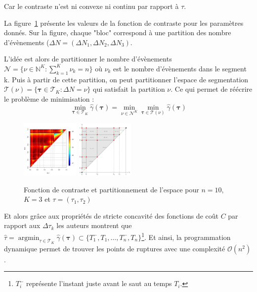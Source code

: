 \documentclass[a4paper,10pt]{article}\usepackage[]{graphicx}\usepackage[]{xcolor}
\DeclareMathOperator*{\argmin}{argmin}
\newcommand{\segspace}{\mathcal{T}_K}
\newcommand{\N}{\mathbb{N}}
\begin{document}
Car le contraste n'est ni convexe ni continu par rapport à $\tau$.

La figure~\ref{fig:contrast-function} présente les valeurs de la fonction de 
contraste pour les paramètres donnés. Sur la figure, chaque "bloc" correspond à
une partition des nombre d'évènements ($\Delta N = (\Delta N_1, \Delta N_2, 
\Delta N_3)$.

L'idée est alors de partitionner le nombre d'évènements  $\mathcal{N} = 
\bigl\{ \nu \in \N^K : \sum_{k=1}^K \nu_k = n \bigr\}$ où $\nu_k$ est le nombre
d'évènements dans le segment k. Puis à partir de cette partition, on peut 
partitionner l'espace de segmentation $\mathcal{T}(\nu) = 
\bigl\{ \bm \tau \in \segspace : \Delta N = \nu \bigr\}$ qui satisfait la 
partition $\nu$. Ce qui permet de réécrire le problème de minimisation :
$$\min_{\bm{\tau}\in\segspace} \widehat \gamma (\bm{\tau}) = \min_{\nu \in 
\mathcal{N}^K} \min_{\bm{\tau}\in\mathcal{T}(\nu)} \widehat \gamma (\bm{\tau})$$

\newpage

\begin{figure}
    \centering
    \caption{Fonction de contraste et partitionnement de l'espace pour $n=10$, $K=3$ et $\tau = (\tau_1,\tau_2)$}
    \label{fig:contrast-function}
    \includegraphics[width=0.25\textwidth]{contrast-function}
    \includegraphics[width=0.25\textwidth]{space-partitioning}
\end{figure}

Et alors grâce aux propriétés de stricte concavité des fonctions de coût $C$ par
rapport aux $\Delta \tau_k$ les auteurs montrent que $\hat{\tau} = 
\argmin_{\tau\in\segspace} \hat{\gamma}(\bm{\tau}) \subset \bigl\{ T^-_1, T_1, 
\dots, T^-_n, T_n \bigr\}$\footnote{$T_i^-$ représente l'instant juste avant le saut
au temps $T_i$.}. Et ainsi, la programmation dynamique permet de trouver
les points de ruptures avec une complexité $\mathcal{O}(n^2)$.
\end{document}
